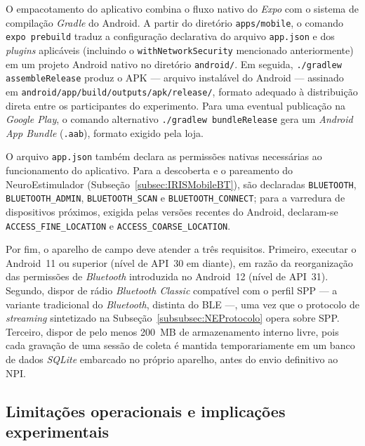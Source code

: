 O empacotamento do aplicativo combina o fluxo nativo do \emph{Expo} com o sistema de compilação \emph{Gradle} do Android. A partir do diretório \texttt{apps/mobile}, o comando \texttt{expo prebuild} traduz a configuração declarativa do arquivo \texttt{app.json} e dos \emph{plugins} aplicáveis (incluindo o \texttt{withNetworkSecurity} mencionado anteriormente) em um projeto Android nativo no diretório \texttt{android/}. Em seguida, \texttt{./gradlew assembleRelease} produz o APK --- arquivo instalável do Android --- assinado em \texttt{android/app/build/outputs/apk/release/}, formato adequado à distribuição direta entre os participantes do experimento. Para uma eventual publicação na \emph{Google Play}, o comando alternativo \texttt{./gradlew bundleRelease} gera um \emph{Android App Bundle} (\texttt{.aab}), formato exigido pela loja.

O arquivo \texttt{app.json} também declara as permissões nativas necessárias ao funcionamento do aplicativo. Para a descoberta e o pareamento do NeuroEstimulador (Subseção~\ref{subsec:IRISMobileBT}), são declaradas \texttt{BLUETOOTH}, \texttt{BLUETOOTH\_ADMIN}, \texttt{BLUETOOTH\_SCAN} e \texttt{BLUETOOTH\_CONNECT}; para a varredura de dispositivos próximos, exigida pelas versões recentes do Android, declaram-se \texttt{ACCESS\_FINE\_LOCATION} e \texttt{ACCESS\_COARSE\_LOCATION}.


Por fim, o aparelho de campo deve atender a três requisitos. Primeiro, executar o Android~11 ou superior (nível de API~30 em diante), em razão da reorganização das permissões de \emph{Bluetooth} introduzida no Android~12 (nível de API~31). Segundo, dispor de rádio \emph{Bluetooth Classic} compatível com o perfil SPP --- a variante tradicional do \emph{Bluetooth}, distinta do BLE ---, uma vez que o protocolo de \emph{streaming} sintetizado na Subseção~\ref{subsubsec:NEProtocolo} opera sobre SPP. Terceiro, dispor de pelo menos 200~MB de armazenamento interno livre, pois cada gravação de uma sessão de coleta é mantida temporariamente em um banco de dados \emph{SQLite} embarcado no próprio aparelho, antes do envio definitivo ao NPI.

\subsection{Limitações operacionais e implicações experimentais}\label{subsec:DeployLimitacoes}

